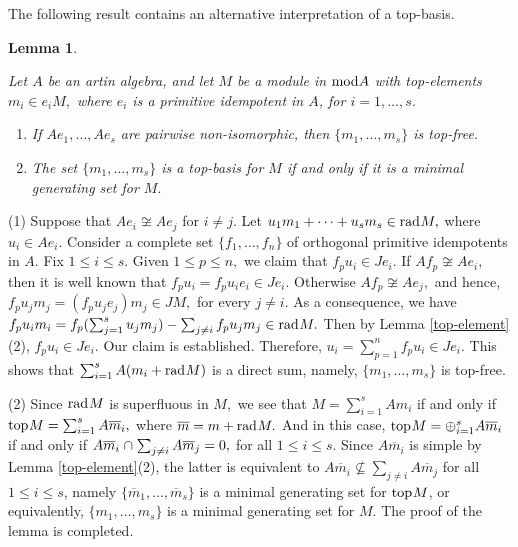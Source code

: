\documentclass[10pt]{amsart}
\newtheorem{Lemma}[Theo]{Lemma}
\theoremstyle{definition}
\newcommand{\mmod}{{\rm mod}}
\newcommand{\rad}{{\rm rad}\hspace{.5pt}}
\newcommand{\ntop}{{\rm top}\hspace{.5pt}}
\newcommand{\hp}{\hspace{.5pt}}
\newcommand{\vp}{\vspace{.5pt}}
\begin{document}
\smallskip

The following result contains an alternative interpretation of a top-basis.

\begin{Lemma}\label{tb_gen}

Let $A$ be an artin algebra, and let $M$ be a module in $\mmod A$ with top-elements $m_i\in e_iM,$ where $e_i$ is a primitive idempotent in $A$, for $i=1, \ldots, s$. 

\begin{enumerate}[$(1)$]

\vspace{-2pt}

\item If $Ae_1, \ldots, Ae_s$ are pairwise non-isomorphic, then $\{m_1, \ldots, m_s\}$ is top-free.

\item The set $\{m_1, \ldots, m_s\}$ is a top-basis for $M$ if and only if it is a minimal gene\-rating set for $M.$

\end{enumerate} \end{Lemma}

\vspace{-1.5pt}

 (1) Suppose that $Ae_i\not\cong Ae_j$ for $i\ne j$. Let $u_1m_1+\cdots +u_sm_s\in \rad M,$ where $u_i\in Ae_i$. Consider a complete set $\{f_1, \ldots, f_n\}$ of orthogonal primitive idempotents in $A$. Fix $1\le i\le s$. Given $1\le p\le n,$
we claim that $f_pu_i\in Je_i.$ If $Af_p \not\cong Ae_i$, then it is well known that $f_pu_i=f_pu_ie_i\in Je_i.$ Otherwise $Af_p \not\cong Ae_j,$ and hence, \vp \vp $f_pu_jm_j=(f_pu_je_j)m_j\in J M,$ for every $j\ne i.$ As a consequence, we have \vp $f_pu_im_i=f_p(\sum_{j=1}^su_jm_j) - \sum_{j\ne i} f_pu_jm_j \in \rad M.$ Then by Lemma \ref{top-element}(2), $f_pu_i\in Je_i.$ Our claim is established. Therefore, $u_i=\sum_{p=1}^nf_pu_i\in Je_i.$ \vspace{-.5pt} This shows that $\sum_{i=1}^s A(m_i+\rad M)$ is a direct sum, namely, $\{m_1, \ldots, m_s\}$ is top-free.

\vp \vp

(2) Since $\rad M$ is superfluous in $M,$ 
we see that $M=\sum_{i=1}^s A m_i $ if and only if $\ntop M=\sum_{i=1}^s A \overline m_i,$ where $\overline{m}=m+\rad M.$ And in this case, \vp $\ntop M=\oplus_{i=1}^s A \overline m_i$ if and only if $A \overline m_i \hp \cap \hp \sum_{j\ne i} A \overline m_j=0,$ for all $1\le i\le s$.
Since $A\overline m_i$ is simple by Lemma \ref{top-element}(2), 
the latter is equivalent to
$A\overline m_i \not\subseteq \sum_{j\ne i} A \overline m_j$ for all $1\le i\le s$, namely
$\{\overline m_1, \ldots, \overline m_s\}$ is a minimal generating set for $\ntop M$, or equivalently, $\{m_1, \ldots, m_s\}$ is a minimal generating set for $M$. The proof of the lemma is completed.
\end{document}
